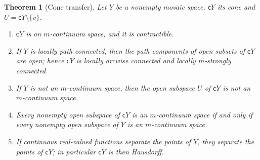 \documentclass[11pt]{amsart}
\newtheorem{theorem}{Theorem}[section]
\theoremstyle{definition}
\theoremstyle{remark}
\newcommand{\cone}{\mathsf{c}}
\numberwithin{equation}{section}
\begin{document}
\begin{theorem}[Cone transfer]\label{thm:conetransfer}
Let $Y$ be a nonempty mosaic space, $\cone Y$ its cone and $U=\cone Y\setminus\{v\}$.
\begin{enumerate}[label=\textup{(\arabic*)}]
\item $\cone Y$ is an $m$-continuum space, and it is contractible.
\item If $Y$ is locally path connected, then the path components of open subsets of $\cone Y$ are open; hence $\cone Y$ is locally arcwise connected and locally $m$-strongly connected.
\item If $Y$ is not an $m$-continuum space, then the open subspace $U$ of $\cone Y$ is not an $m$-continuum space.
\item Every nonempty open subspace of $\cone Y$ is an $m$-continuum space if and only if every nonempty open subspace of $Y$ is an $m$-continuum space.
\item If continuous real-valued functions separate the points of $Y$, they separate the points of $\cone Y$; in particular $\cone Y$ is then Hausdorff.
\end{enumerate}
\end{theorem}
\end{document}
